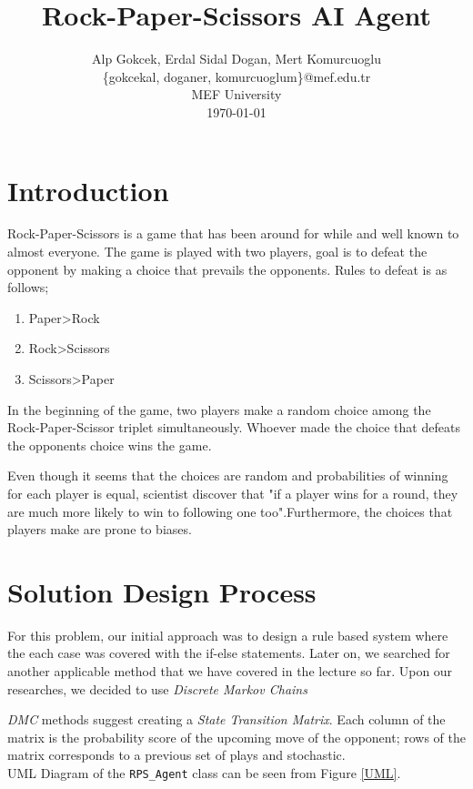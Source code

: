 \documentclass{IEEEtran}
\author{Alp Gokcek, Erdal Sidal Dogan, Mert Komurcuoglu\\\{gokcekal, doganer, komurcuoglum\}@mef.edu.tr\\ MEF University \\ \today}
\title{Rock-Paper-Scissors AI Agent}
\begin{document}
	\maketitle
	\section{Introduction}
	
	Rock-Paper-Scissors is a game that has been around for while and well known to almost everyone. The game is played with two players, goal is to defeat the opponent by making a choice that prevails the opponents. Rules to defeat is as follows;
	
	\begin{enumerate}
		\item Paper\textgreater Rock
		\item Rock\textgreater Scissors	
		\item Scissors\textgreater Paper
	\end{enumerate}
	
	In the beginning of the game, two players make a random choice among the Rock-Paper-Scissor triplet simultaneously. Whoever made the choice that defeats the opponents choice wins the game.
	
	Even though it seems that the choices are random and probabilities of winning for each player is equal, scientist discover that "if a player wins for a round, they are much more likely to win to following one too".Furthermore, the choices that players make are prone to biases. \cite{winning-rps} 
	
	\section{Solution Design Process}
	
	For this problem, our initial approach was to design a rule based system where the each case was covered with the if-else statements. Later on, we searched for another applicable method that we have covered in the lecture so far. Upon our researches, we decided to use \textit{Discrete Markov Chains}
	
	\textit{DMC} methods suggest creating a \textit{State Transition Matrix}. Each column of the matrix is the probability score of the upcoming move of the opponent; rows of the matrix corresponds to a previous set of plays and stochastic. \\
	
	UML Diagram of the \texttt{RPS\_Agent} class can be seen from Figure \ref{UML}.
	
\end{document}
